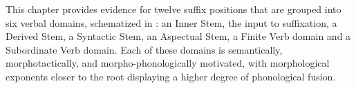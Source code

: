 This chapter provides evidence for twelve suffix positions that are grouped into six verbal domains, schematized in : an Inner Stem, the input to suffixation, a Derived Stem, a Syntactic Stem, an Aspectual Stem, a Finite Verb domain and a Subordinate Verb domain. Each of these domains is semantically, morphotactically, and morpho-phonologically motivated, with morphological exponents closer to the root displaying a higher degree of phonological fusion.

\begin{table}
\caption{Choguita Rarámuri verbal stem domains}
\label{tab:verb-stem-levels intro}
\end{table}


